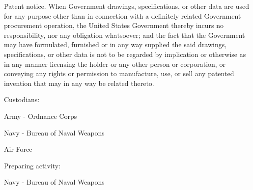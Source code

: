 \documentclass[10pt]{article}
\begin{document}
Patent notice. 
When Government drawings, specifications, or other data are used for any purpose other than in connection with a definitely related Government procurement operation, the United States Government thereby incurs no responsibility, nor any obligation whatsoever; and the fact that the Government may have formulated, furnished or in any way supplied the said drawings, specifications, or other data is not to be regarded by implication or otherwise as in any manner licensing the holder or any other person or corporation, or conveying any rights or permission to manufacture, use, or sell any patented invention that may in any way be related thereto.

\noindent Custodians:

Army - Ordnance Corps

Navy - Bureau of Naval Weapons

Air Force

\noindent Preparing activity:

Navy - Bureau of Naval Weapons
\end{document}
